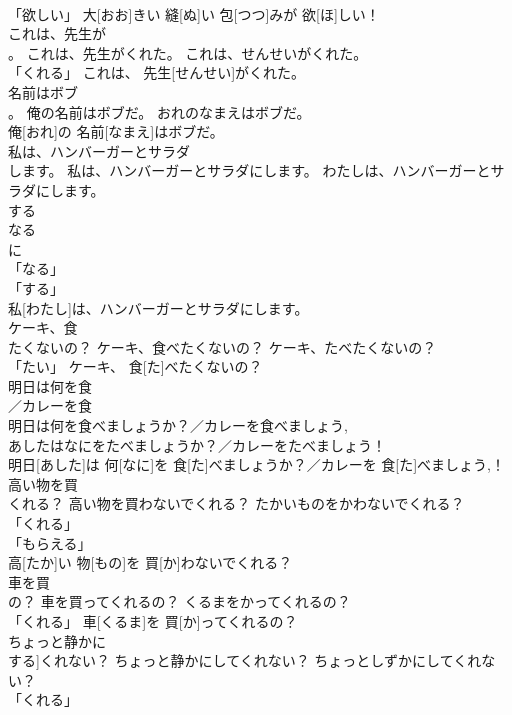 \documentclass[8pt]{extreport}
\begin{document}
\begin{CJK}{UTF8}{min}
\\	「欲しい」	大[おお]きい 縫[ぬ]い 包[つつ]みが 欲[ほ]しい！		
\\	これは、先生が
\\	。	これは、先生がくれた。	これは、せんせいがくれた。	
\\	「くれる」	これは、 先生[せんせい]がくれた。		
\\	名前はボブ
\\	。	俺の名前はボブだ。	おれのなまえはボブだ。	
\\	俺[おれ]の 名前[なまえ]はボブだ。		
\\	私は、ハンバーガーとサラダ
\\	します。	私は、ハンバーガーとサラダにします。	わたしは、ハンバーガーとサラダにします。	
\\	する 
\\	なる 
\\	に 
\\	「なる」 
\\	「する」 
\\	私[わたし]は、ハンバーガーとサラダにします。		
\\	ケーキ、食
\\	たくないの？	ケーキ、食べたくないの？	ケーキ、たべたくないの？	
\\	「たい」	ケーキ、 食[た]べたくないの？		
\\	明日は何を食
\\	／カレーを食
\\	明日は何を食べましょうか？／カレーを食べましょう, 
\\	あしたはなにをたべましょうか？／カレーをたべましょう！	
\\	明日[あした]は 何[なに]を 食[た]べましょうか？／カレーを 食[た]べましょう,！		
\\	高い物を買
\\	くれる？	高い物を買わないでくれる？	たかいものをかわないでくれる？	
\\	「くれる」 
\\	「もらえる」 
\\	高[たか]い 物[もの]を 買[か]わないでくれる？		
\\	車を買
\\	の？	車を買ってくれるの？	くるまをかってくれるの？	
\\	「くれる」	車[くるま]を 買[か]ってくれるの？		
\\	ちょっと静かに
\\	する]くれない？	ちょっと静かにしてくれない？	ちょっとしずかにしてくれない？	
\\	「くれる」 

\end{CJK}
\end{document}

